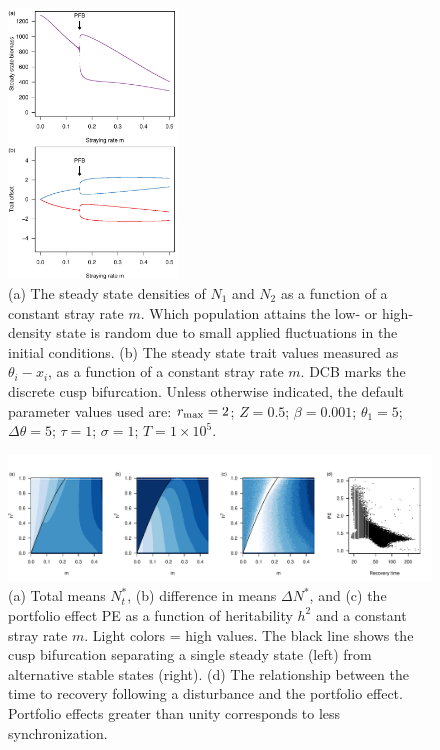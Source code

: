 \documentclass{revtex4}
\begin{document}
\clearpage


\begin{figure}
  \captionsetup{justification=raggedright,
singlelinecheck=false
}
\centering
\includegraphics[width=0.4\textwidth]{fig_traj.pdf}
\caption{
(a) The steady state densities of $N_1$ and $N_2$ as a function of a constant stray rate $m$. Which population attains the low- or high-density state is random due to small applied fluctuations in the initial conditions.
(b) The steady state trait values measured as $\theta_i - x_i$, as a function of a constant stray rate $m$. 
DCB marks the discrete cusp bifurcation.
Unless otherwise indicated, the default parameter values used are: $r_{\rm max}=2$; $Z=0.5$; $\beta=0.001$; $\theta_1=5$; $\Delta\theta=5$; $\tau=1$; $\sigma=1$; $T=1\times10^5$.
} \label{fig:traj}
\end{figure}

\begin{figure}
  \captionsetup{justification=raggedright,
singlelinecheck=false
}
\centering
\includegraphics[width=1\textwidth]{fig_MDPE_hm.pdf}
\caption{
(a) Total means $N_t^*$, 
(b) difference in means $\Delta N^*$, and 
(c) the portfolio effect PE as a function of heritability $h^2$ and a constant stray rate $m$. Light colors = high values.
The black line shows the cusp bifurcation separating a single steady state (left) from alternative stable states (right).
(d) The relationship between the time to recovery following a disturbance and the portfolio effect. Portfolio effects greater than unity corresponds to less synchronization.
} \label{fig:PE}
\end{figure}
\end{document}
